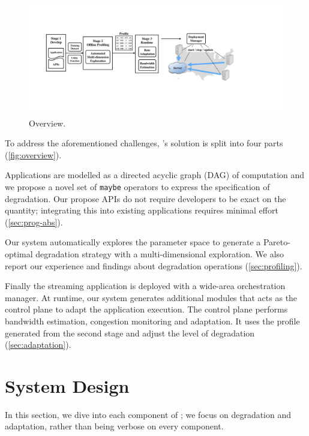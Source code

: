 \begin{figure}
  \centering
  \includegraphics[width=\linewidth]{figures/arch.pdf}
  \caption{\sysname{} Overview.}
  \label{fig:overview}
\end{figure}

To address the aforementioned challenges, \sysname{}'s solution is split into
four parts (\autoref{fig:overview}).

 Applications are modelled as a directed acyclic
graph (DAG) of computation and we propose a novel set of \texttt{maybe}
operators to express the specification of degradation. Our propose APIs do not
require developers to be exact on the quantity; integrating this into existing
applications requires minimal effort (\autoref{sec:prog-abs}).

 Our system automatically explores
the parameter space to generate a Pareto-optimal degradation strategy with a
multi-dimensional exploration. We also report our experience and findings about
degradation operations (\autoref{sec:profiling}).

 Finally the streaming application is deployed with a
wide-area orchestration manager. At runtime, our system generates additional
modules that acts as the control plane to adapt the application execution. The
control plane performs bandwidth estimation, congestion monitoring and
adaptation. It uses the profile generated from the second stage and adjust the
level of degradation (\autoref{sec:adaptation}).

\section{System Design}
\label{sec:system-design}

In this section, we dive into each component of \sysname{}; we focus on
degradation and adaptation, rather than being verbose on every component.

